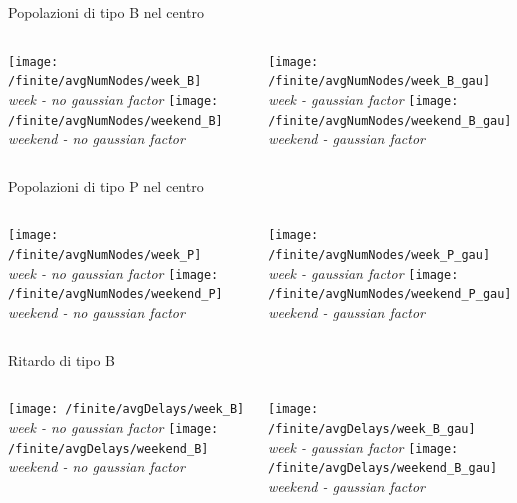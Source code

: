 \documentclass[xcolor=table]{beamer}
\begin{document}
\begin{frame}{Popolazioni di tipo B nel centro}
\begin{columns}
\centering
\texttt{[image: /finite/avgNumNodes/week\_B]}\\
\textit{week - no gaussian factor}
\texttt{[image: /finite/avgNumNodes/weekend\_B]}\\
\textit{weekend - no gaussian factor}

\centering
\texttt{[image: /finite/avgNumNodes/week\_B\_gau]}\\
\textit{week - gaussian factor}
\texttt{[image: /finite/avgNumNodes/weekend\_B\_gau]}\\
\textit{weekend - gaussian factor}
\end{columns}
\end{frame}

\begin{frame}{Popolazioni di tipo P nel centro}
\begin{columns}
\centering
\texttt{[image: /finite/avgNumNodes/week\_P]}\\
\textit{week - no gaussian factor}
\texttt{[image: /finite/avgNumNodes/weekend\_P]}\\
\textit{weekend - no gaussian factor}

\centering
\texttt{[image: /finite/avgNumNodes/week\_P\_gau]}\\
\textit{week - gaussian factor}
\texttt{[image: /finite/avgNumNodes/weekend\_P\_gau]}\\
\textit{weekend - gaussian factor}
\end{columns}
\end{frame}


\begin{frame}{Ritardo di tipo B}
\begin{columns}
\centering
\texttt{[image: /finite/avgDelays/week\_B]}\\
\textit{week - no gaussian factor}
\texttt{[image: /finite/avgDelays/weekend\_B]}\\
\textit{weekend - no gaussian factor}

\centering
\texttt{[image: /finite/avgDelays/week\_B\_gau]}\\
\textit{week - gaussian factor}
\texttt{[image: /finite/avgDelays/weekend\_B\_gau]}\\
\textit{weekend - gaussian factor}
\end{columns}
\end{frame}
\end{document}
